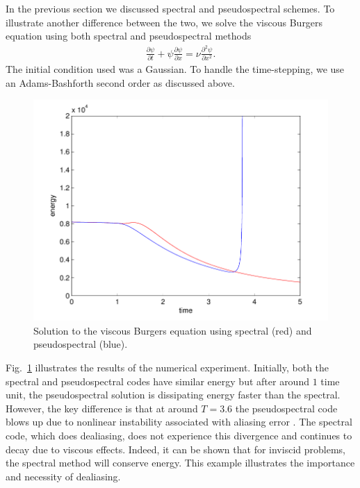 In the previous section we discussed spectral and pseudospectral schemes. To illustrate another difference between the two, we solve the viscous Burgers equation using both spectral and pseudospectral methods \cite{durran}
\begin{align}
\frac{\partial \psi}{\partial t} + \psi\frac{\partial \psi}{\partial x} = \nu \frac{\partial^{2}\psi}{\partial x^{2}}.
\end{align}
The initial condition used was a Gaussian. To handle the time-stepping, we use an Adams-Bashforth second order as discussed above.
\begin{figure}
\begin{center}
\includegraphics[width=\textwidth]{spec_vs_pspec}
\caption{Solution to the viscous Burgers equation using spectral (red) and pseudospectral (blue).}
\label{spectralvpseudo}
\end{center}
\end{figure}
Fig.~\ref{spectralvpseudo} illustrates the results of the numerical experiment. Initially, both the spectral and pseudospectral codes have similar energy but after around $1$ time unit, the pseudospectral solution is dissipating energy faster than the spectral. However, the key difference is that at around $T=3.6$ the pseudospectral code blows up due to nonlinear instability associated with aliasing error \cite{durran}. The spectral code, which does dealiasing, does not experience this divergence and continues to decay due to viscous effects. Indeed, it can be shown \cite{durran} that for inviscid problems, the spectral method will conserve energy. This example illustrates the importance and necessity of dealiasing. 

